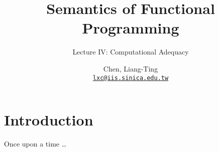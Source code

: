 \title{Semantics of Functional Programming}
\subtitle{Lecture IV: Computational Adequacy}
\author[L.-T. Chen]{Chen, Liang-Ting\\
  \href{mailto:lxc@iis.sinica.edu.tw}{\texttt{lxc@iis.sinica.edu.tw}}}

\frame{\maketitle}
\section{Introduction}  
\begin{frame}
  Once upon a time \dots 
\end{frame}

